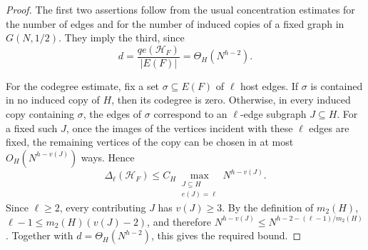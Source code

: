 \documentclass[10pt,a4paper]{amsart}
\newcommand{\calH}{\mathcal H}
\begin{document}
\begin{proof}
The first two assertions follow from the usual concentration estimates for the
number of edges and for the number of induced copies of a fixed graph in
$G(N,1/2)$.  They imply the third, since
$$
        d=\frac{qe(\calH_F)}{|E(F)|}=\Theta_H(N^{h-2}).
$$

For the codegree estimate, fix a set $\sigma\subseteq E(F)$ of $\ell$ host
edges.  If $\sigma$ is contained in no induced copy of $H$, then its
codegree is zero.  Otherwise, in every induced copy containing $\sigma$, the
edges of $\sigma$ correspond to an $\ell$-edge subgraph $J\subseteq H$.
For a fixed such $J$, once the images of the vertices incident with these
$\ell$ edges are fixed, the remaining vertices of the copy can be chosen in
at most $O_H(N^{h-v(J)})$ ways.  Hence
$$
        \Delta_\ell(\calH_F)
        \le C_H\max_{\substack{J\subseteq H\\ e(J)=\ell}}N^{h-v(J)}.
$$
Since $\ell\ge2$, every contributing $J$ has $v(J)\ge3$.  By the
definition of $m_2(H)$, $\ell-1\le m_2(H)(v(J)-2)$,
and therefore $ N^{h-v(J)}\le N^{h-2-(\ell-1)/m_2(H)}$. Together with $d=\Theta_H(N^{h-2})$, this gives the required bound.
\end{proof}
\end{document}
